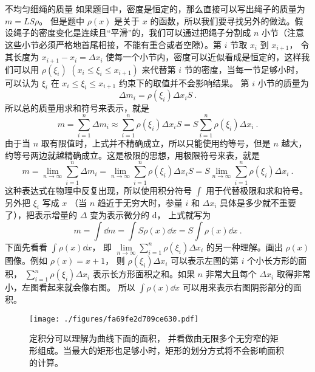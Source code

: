 \begin{example}{不均匀细绳的质量}
如果题目中，密度是恒定的，那么直接可以写出绳子的质量为 $m = LS\rho$。 但是题中 $\rho(x)$ 是关于 $x$ 的函数，所以我们要寻找另外的做法。假设绳子的密度变化是连续且“平滑”的，我们可以通过把绳子分割成 $n$ 小节（注意这些小节必须严格地首尾相接，不能有重合或者空隙）。第 $i$ 节取 $x_i$ 到 $x_{i +1}$， 令其长度为 $x_{i + 1} - {x_i} = \Delta x_i$ 使每一个小节内，密度可以近似看成是恒定的，这样我们可以用 $\rho(\xi_i)\,\, (x_i \leqslant \xi_i \leqslant x_{i + 1})$ 来代替第 $i$ 节的密度，当每一节足够小时，可以认为 $\xi_i$ 在 $x_i \leqslant \xi_i \leqslant x_{i + 1}$ 约束下的取值并不会影响结果。 第 $i$ 小节的质量为
\begin{equation}
\Delta {m_i} = \rho (\xi_i)\Delta {x_i}S ~.
\end{equation}
所以总的质量用求和符号来表示，就是
\begin{equation}
m = \sum_{i = 1}^n \Delta m_i  \approx \sum_{i = 1}^n \rho(\xi_i)\Delta x_i S   = S \sum_{i = 1}^n \rho (\xi_i)\Delta x_i~.
\end{equation}
由于当 $n$ 取有限值时，上式并不精确成立，所以只能使用约等号，但是 $n$ 越大，约等号两边就越精确成立。这是极限的思想，用极限符号来表，就是
\begin{equation}
m = \lim_{n \to \infty } \sum_{i = 1}^n {\Delta {m_i}}  = \lim_{n \to \infty } \sum_{i = 1}^n \rho(\xi_i)\Delta {x_i} S = S \lim_{n \to \infty } \sum_{i = 1}^n \rho(\xi_i)\Delta {x_i}~.
\end{equation}
这种表达式在物理中反复出现，所以使用积分符号 $\int {} $ 用于代替极限和求和符号。另外把 ${\xi_i}$ 写成 $x$ （当 $n$ 趋近于无穷大时，参量 $i$ 和 $\Delta {x_i}$ 具体是多少就不重要了），把表示增量的 $\Delta $ 变为表示微分的 $\mathrm{d}$， 上式就写为
\begin{equation}
m = \int \dd{m}  = \int S\rho(x) \dd{x}  = S\int \rho(x) \dd{x}~.
\end{equation}
下面先看看 $\int \rho(x) \dd{x}$， 即 $\lim\limits_{n \to \infty } \sum\limits_{i = 1}^n \rho(\xi_i)\Delta {x_i}$ 的另一种理解。画出 $\rho (x)$ 图像。例如 $\rho(x) = x + 1$， 则 $\rho(\xi_i)\Delta {x_i}$ 可以表示左图的第 $i$ 个小长方形的面积， $\sum\limits_{i = 1}^n \rho(\xi_i)\Delta x_i$ 表示长方形面积之和。如果 $n$ 非常大且每个 $\Delta x_i$ 取得非常小，左图看起来就会像右图。 所以 $\int \rho(x) \dd{x}$ 可以用来表示右图阴影部分的面积。

\begin{figure}[ht]
\centering
\texttt{[image: ./figures/fa69fe2d709ce630.pdf]}
\caption{定积分可以理解为曲线下面的面积， 并看做由无限多个无穷窄的矩形组成。当最大的矩形也足够小时，矩形的划分方式将不会影响面积的计算。} \label{fig_DefInt_4}
\end{figure}


\end{example}

